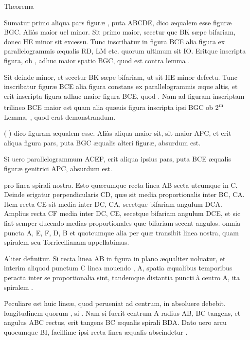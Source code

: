 \documentclass[11pt,a4paper]{article}
\begin{document}
Theorema

Sumatur primo aliqua pars figuræ \ill{}, puta ABCDE, dico æqualem esse figuræ BGC. Aliàs maior \ill{} uel minor. Sit primo maior, secetur que BK sæpe bifariam, donec HE minor sit excessu. Tunc inscribatur in figura  BCE alia figura ex parallelogrammis æqualis RD, LM etc. quorum ultimum sit IO. Eritque inscripta figura, ob \ill{}, adhuc maior spatio BGC, quod est contra lemma \ill{}.

Sit deinde minor, et secetur BK sæpe bifariam, ut \ill{} sit HE minor defectu. Tunc inscribatur figuræ BCE alia figura constans ex parallelogrammis æque altis, et erit inscripta figura adhuc maior figura BCE, quod \ill{}. Nam ad figuram inscriptam trilineo BCE maior est quam alia quæuis figura inscripta ipsi BGC ob 2\textsuperscript{m} Lemma, \ill{} \ill{}, quod erat demonstrandum.

\ill{} \ill{} \ill{} (\ill{} \ill{} \ill{} \ill{}) dico figuram \ill{} æqualem esse. Aliàs aliqua \ill{} maior sit, sit maior APC, et \struck{\ill{} \ill{}} erit aliqua figura \ill{} pars, puta BGC æqualis alteri figuræ, \ill{} absurdum est.

Si uero parallelogrammum  ACEF, erit aliqua ipsius pars, puta BCE æqualis figuræ genitrici APC, absurdum est.

\ill{} \ill{} pro linea spirali nostra. Esto quæcumque  recta linea AB secta utcumque in C. Deinde erigatur perpendicularis CD, quæ sit media proportionalis inter BC, CA. Item recta CE sit media inter DC, CA, secetque bifariam angulum DCA. Amplius recta CF media inter DC, CE, secetque bifariam angulum DCE, et sic fiat semper ducendo medias proportionales quæ bifariam secent angulos. \ill{} omnia puncta A, E, F, D, B et quotcumque alia \ill{} per quæ transibit linea nostra, quam spiralem \ill{} seu Torricellianam appellabimus.

Aliter definitur. Si recta linea AB in \ill{} figura in plano æqualiter \ill{} uoluatur, et interim aliquod punctum C \ill{} linea \ill{} \ill{} mouendo \ill{} \ill{} \ill{} \ill{}, \ill{} \ill{} A, \ill{} spatia æqualibus temporibus peracta inter se proportionalia sint, tandemque \ill{} \ill{} \ill{} distantia \ill{} puncti à centro A, ita \ill{} spiralem \ill{}.

Peculiare \ill{} est huic lineæ, quod \ill{} perueniat ad centrum, \ill{}  in \ill{} absoluere debebit. \ill{} longitudinem \ill{} \ill{} quorum \ill{}, si \ill{} \struck{\ill{}} \ill{} \ill{}. Nam si fuerit centrum A \ill{} radius AB, \ill{} BC tangens, et angulus ABC rectus, erit tangens BC æqualis \ill{} spirali BDA. Dato uero arcu quocumque BI, facillime ipsi recta linea æqualis abscindetur \ill{}.
\end{document}

